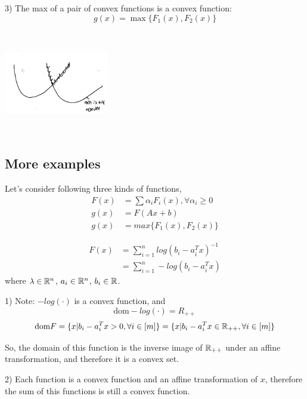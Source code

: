 3) The max of a pair of convex functions is a convex function:
\begin{equation*}
g(x) = \max\{F_1(x), F_2(x) \}
\end{equation*}


\begin{marginfigure}
	\centering
	\includegraphics[width=1.8in,height=1.8in]{figures/ch08/figure1030_14.png}
\end{marginfigure}




\subsection{More examples}
Let's consider following three kinds of functions,
\begin{align*}
F(x) &=\sum\alpha_iF_i(x), \forall \alpha_i\geq 0\\
g(x) &= F(Ax + b)\\
g(x) &= max\{F_1(x), F_2(x) \}
\end{align*}

\begin{example}
\begin{align*}
F(x) 
&= \sum^{n}_{i=1}log(b_i - a_i^Tx)^{-1}\\
&=\sum^n_{i=1}-log(b_i - a_i^Tx)
\end{align*}
where $\lambda \in \mathbb{R}^n$, $a_i\in \mathbb{R}^n$, $b_i\in \mathbb{R}$.

1) Note: $-log(\cdot)$ is a convex function, and 
$$\text{dom}-log(\cdot) = R_{++}$$
$$\text{dom}F = \{x|b_i - a_i^Tx >0, \forall i\in [m] \} =\{x|b_i - a_i^Tx \in \mathbb{R}_{++}, \forall i\in [m]\}$$ 

So, the domain of this function is the inverse image of $\mathbb{R}_{++}$ under an affine transformation, and therefore it is a convex set. 

2) Each function is a convex function and an affine transformation of $x$, therefore the sum of this functions is still a convex function.
\end{example}



